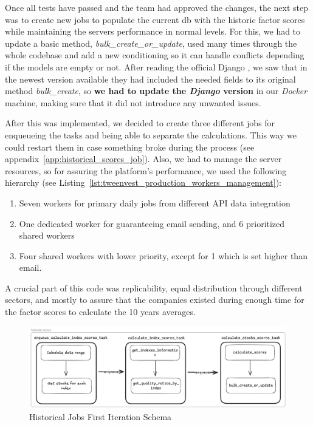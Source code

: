 \documentclass[11pt,english,a4paper,hidelinks]{book}
\begin{document}
Once all tests have passed and the team had approved the changes, the next step was to create new \acrshort{job}s to populate the current \acrshort{db} with the historic factor scores while maintaining the servers performance in normal levels. For this, we had to update a basic method, \textit{bulk\_create\_or\_update}, used many times through the whole codebase and add a new conditioning so it can handle conflicts depending if the models are empty or not. After reading the official Django \textcite{django2025queryset}, we saw that in the newest version available they had included the needed fields to its original method \textit{bulk\_create}, so \textbf{we had to update the \textit{Django} version} in our \textit{Docker} machine, making sure that it did not introduce any unwanted issues.

\vspace{0.5cm}
\noindent After this was implemented, we decided to create three different jobs for enqueueing the tasks and being able to separate the calculations. This way we could restart them in case something broke during the process (see appendix~\ref{app:historical_scores_job}). Also, we had to manage the server resources, so for assuring the platform's performance, we used the following hierarchy (see Listing~\ref{lst:tweenvest_production_workers_management}):
\begin{enumerate}
    \item Seven workers for primary daily jobs from different API data integration
    \item One dedicated worker for guaranteeing email sending, and 6 prioritized shared workers
    \item Four shared workers with lower priority, except for 1 which is set higher than email.
\end{enumerate}

\vspace{0.5cm}
\noindent A crucial part of this code was replicability, equal distribution through different sectors, and mostly to assure that the companies existed during enough time for the factor scores to calculate the 10 years averages.
\begin{figure}[H]
    \centering
    \includegraphics[width=1\textwidth]{images/tweenvest/Historical Jobs First Iteration.png}
    \caption{Historical Jobs First Iteration Schema}
    \label{fig:historical_jobs_first_iteration}
\end{figure}
\end{document}
